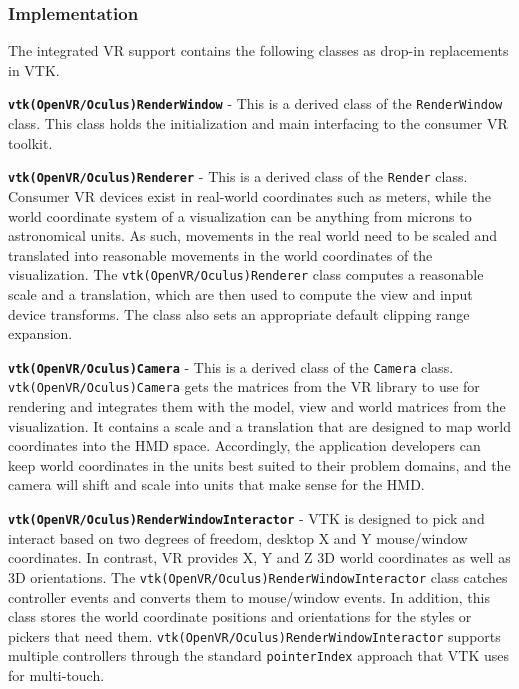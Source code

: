 \subsubsection{Implementation}

The integrated VR support contains the following classes as drop-in replacements in VTK.

\textbf{\texttt{vtk(OpenVR/Oculus)RenderWindow}} - This is a derived class of the \texttt{RenderWindow} class.
This class holds the initialization and main interfacing to the consumer VR toolkit. 

\textbf{\texttt{vtk(OpenVR/Oculus)Renderer}} - This is a derived class of the \texttt{Render} class.
Consumer VR devices exist in real-world coordinates such as meters, while the world coordinate system of a visualization can be anything from microns to astronomical units. As such, movements in the real world need to be scaled and translated into reasonable movements in the world coordinates of the visualization. The \texttt{vtk(OpenVR/Oculus)Renderer} class computes a reasonable scale and a translation, which are then used to compute the view and input device transforms. 
The class also sets an appropriate default clipping range expansion.

\textbf{\texttt{vtk(OpenVR/Oculus)Camera}} - This is a derived class of the \texttt{Camera} class. \texttt{vtk(OpenVR/Oculus)Camera} gets the matrices from the VR library to use for rendering and integrates them with the model, view and world matrices from the visualization. It contains a scale and a translation that are designed to map world coordinates into the HMD space.
Accordingly, the application developers can keep world coordinates in the units best suited to their problem domains, and the camera will shift and scale into units that make sense for the HMD.

\textbf{\texttt{vtk(OpenVR/Oculus)RenderWindowInteractor}} - VTK is designed to pick and interact based on two degrees of freedom, desktop X and Y mouse/window coordinates.
In contrast, VR provides X, Y and Z 3D world coordinates as well as 3D orientations.
The \texttt{vtk(OpenVR/Oculus)RenderWindowInteractor} class catches controller events and converts them to mouse/window events.
In addition, this class stores the world coordinate positions and orientations for the styles or pickers that need them.
\texttt{vtk(OpenVR/Oculus)RenderWindowInteractor} supports multiple controllers through the standard \texttt{pointerIndex} approach that VTK uses for multi-touch.

